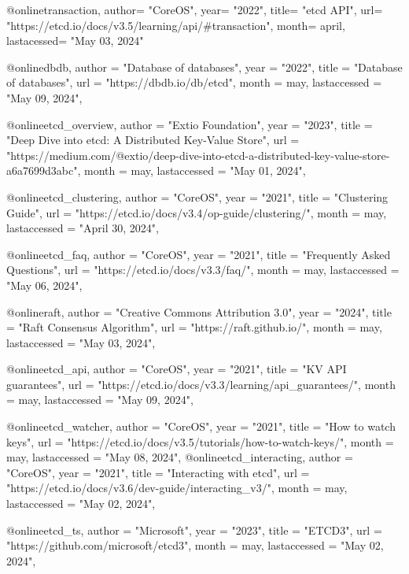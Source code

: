 @online{transaction,
    author=        "CoreOS",
    year=          "2022",
    title=         "etcd API",
    url=           "https://etcd.io/docs/v3.5/learning/api/#transaction",
    month=         april,
    lastacessed=   "May 03, 2024"
}

@online{dbdb,
  author =       "Database of databases",
  year =         "2022",
  title =        "Database of databases",
  url =          "https://dbdb.io/db/etcd",
  month =        may,
  lastaccessed = "May 09, 2024",
}


@online{etcd_overview,
  author =       "Extio Foundation",
  year =         "2023",
  title =        "Deep Dive into etcd: A Distributed Key-Value Store",
  url =          "https://medium.com/@extio/deep-dive-into-etcd-a-distributed-key-value-store-a6a7699d3abc",
  month =        may,
  lastaccessed = "May 01, 2024",
}

@online{etcd_clustering,
  author =       "CoreOS",
  year =         "2021",
  title =        "Clustering Guide",
  url =          "https://etcd.io/docs/v3.4/op-guide/clustering/",
  month =        may,
  lastaccessed = "April 30, 2024",
}

@online{etcd_faq,
  author =       "CoreOS",
  year =         "2021",
  title =        "Frequently Asked Questions",
  url =          "https://etcd.io/docs/v3.3/faq/",
  month =        may,
  lastaccessed = "May 06, 2024",
}

@online{raft,
  author =       "Creative Commons Attribution 3.0",
  year =         "2024",
  title =        "Raft Consensus Algorithm",
  url =          "https://raft.github.io/",
  month =        may,
  lastaccessed = "May 03, 2024",
}

@online{etcd_api,
  author =       "CoreOS",
  year =         "2021",
  title =        "KV API guarantees",
  url =          "https://etcd.io/docs/v3.3/learning/api_guarantees/",
  month =        may,
  lastaccessed = "May 09, 2024",
}


@online{etcd_watcher,
  author =       "CoreOS",
  year =         "2021",
  title =        "How to watch keys",
  url =          "https://etcd.io/docs/v3.5/tutorials/how-to-watch-keys/",
  month =        may,
  lastaccessed = "May 08, 2024",
}
@online{etcd_interacting,
  author =       "CoreOS",
  year =         "2021",
  title =        "Interacting with etcd",
  url =          "https://etcd.io/docs/v3.6/dev-guide/interacting_v3/",
  month =        may,
  lastaccessed = "May 02, 2024",
}

@online{etcd_ts,
  author =       "Microsoft",
  year =         "2023",
  title =        "ETCD3",
  url =          "https://github.com/microsoft/etcd3",
  month =        may,
  lastaccessed = "May 02, 2024",
}

